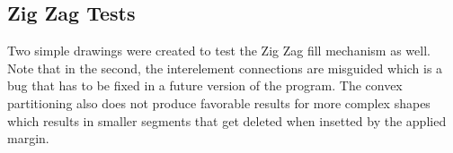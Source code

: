 

\clearpage
\subsection{Zig Zag Tests}

Two simple drawings were created to test the Zig Zag fill mechanism as well. Note that in the second, the interelement connections are misguided which is a bug that has to be fixed in a future version of the program. The convex partitioning also does not produce favorable results for more complex shapes which results in smaller segments that get deleted when insetted by the applied margin.

